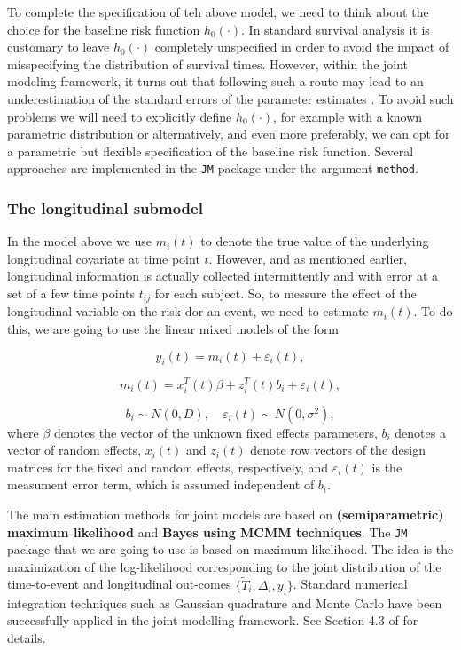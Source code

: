 \documentclass[]{book}
\theoremstyle{definition}
\theoremstyle{definition}
\theoremstyle{definition}
\theoremstyle{remark}
\begin{document}
To complete the specification of teh above model, we need to think about
the choice for the baseline risk function \(h_0(\cdot)\). In standard
survival analysis it is customary to leave \(h_0(\cdot)\) completely
unspecified in order to avoid the impact of misspecifying the
distribution of survival times. However, within the joint modeling
framework, it turns out that following such a route may lead to an
underestimation of the standard errors of the parameter estimates
\citep{BIOM:BIOM570}. To avoid such problems we will need to explicitly
define \(h_0(\cdot)\), for example with a known parametric distribution
or alternatively, and even more preferably, we can opt for a parametric
but flexible specification of the baseline risk function. Several
approaches are implemented in the \texttt{JM} package under the argument
\texttt{method}.

\subsubsection*{The longitudinal
submodel}\label{the-longitudinal-submodel}

In the model above we use \(m_i(t)\) to denote the true value of the
underlying longitudinal covariate at time point \(t\). However, and as
mentioned earlier, longitudinal information is actually collected
intermittently and with error at a set of a few time points \(t_{ij}\)
for each subject. So, to messure the effect of the longitudinal variable
on the risk dor an event, we need to estimate \(m_i(t)\). To do this, we
are going to use the linear mixed models of the form

\[
y_i(t) = m_i(t) + \varepsilon_i(t),
\]

\[
m_i(t) = x_i^T(t)\beta + z_i^T(t)b_i + \varepsilon_i(t),
\]

\[
b_i \sim N(0, D), \quad \varepsilon_i(t) \sim N(0, \sigma^2),
\] where \(\beta\) denotes the vector of the unknown fixed effects
parameters, \(b_i\) denotes a vector of random effects, \(x_i(t)\) and
\(z_i(t)\) denote row vectors of the design matrices for the fixed and
random effects, respectively, and \(\varepsilon_i(t)\) is the measument
error term, which is assumed independent of \(b_i\).

The main estimation methods for joint models are based on
\textbf{(semiparametric) maximum likelihood} and \textbf{Bayes using
MCMM techniques}. The \texttt{JM} package that we are going to use is
based on maximum likelihood. The idea is the maximization of the
log-likelihood corresponding to the joint distribution of the
time-to-event and longitudinal out-comes
\(\{\widetilde T_i,\Delta_i,y_i\}\). Standard numerical integration
techniques such as Gaussian quadrature and Monte Carlo have been
successfully applied in the joint modelling framework. See Section 4.3
of \citet{book:1606416} for details.
\end{document}
